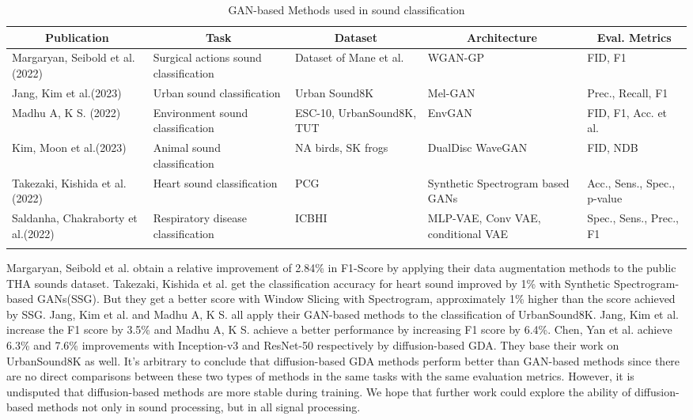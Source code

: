 \documentclass[preprint,12pt,authoryear]{elsarticle}
\begin{document}
{\small
\begin{longtable}{|p{2cm}|p{3cm}|p{2cm}|p{2cm}|p{2cm}|}
\hline
\multicolumn{1}{|c|}{\textbf{Publication}} &
  \multicolumn{1}{c|}{\textbf{Task}} &
  \multicolumn{1}{c|}{\textbf{Dataset}} &
  \multicolumn{1}{c|}{\textbf{Architecture}} &
  \multicolumn{1}{c|}{\textbf{Eval. Metrics}} \\ \hline
\endfirsthead
%
\endhead
%
Margaryan, Seibold et al.(2022)\cite{apl74} &
  Surgical actions sound classification &
  Dataset of Mane et al. &
  WGAN-GP &
  FID, F1 \\ \hline
Jang, Kim et al.(2023)\cite{apl75} &
  Urban sound classification &
  Urban Sound8K &
  Mel-GAN &
  Prec., Recall, F1 \\ \hline
Madhu A, K S. (2022)\cite{apl79} &
  Environment  sound classification &
  ESC-10, UrbanSound8K, TUT &
  EnvGAN &
  FID, F1, Acc. et al. \\ \hline
Kim, Moon et al.(2023)\cite{apl76} &
  Animal sound classification &
  NA birds, SK frogs &
  DualDisc WaveGAN &
  FID, NDB \\ \hline
Takezaki, Kishida et al.(2022)\cite{apl78} &
  Heart sound classification &
  PCG &
  Synthetic Spectrogram based GANs &
  Acc., Sens., Spec., p-value \\ \hline
Saldanha, Chakraborty et al.(2022)\cite{apl77} &
  Respiratory disease classification &
  ICBHI &
  MLP-VAE, Conv VAE, conditional VAE &
  Spec., Sens., Prec., F1 \\ \hline
\caption{GAN-based Methods used in sound classification}
\label{tab:my-table}\\
\end{longtable}}

Margaryan, Seibold et al.\cite{apl74} obtain a relative improvement of 2.84\% in F1-Score by applying their data augmentation methods to the public THA sounds dataset. Takezaki, Kishida et al.\cite{apl78} get the classification accuracy for heart sound improved by 1\% with Synthetic Spectrogram-based GANs(SSG). But they get a better score with Window Slicing with Spectrogram, approximately 1\% higher than the score achieved by SSG. Jang, Kim et al.\cite{apl75} and Madhu A, K S.\cite{apl79} all apply their GAN-based methods to the classification of UrbanSound8K. Jang, Kim et al. increase the F1 score by 3.5\% and Madhu A, K S. achieve a better performance by increasing F1 score by 6.4\%. Chen, Yan et al. achieve 6.3\% and 7.6\% improvements with Inception-v3 and ResNet-50 respectively by diffusion-based GDA. They base their work on UrbanSound8K as well. It's arbitrary to conclude that diffusion-based GDA methods perform better than GAN-based methods since there are no direct comparisons between these two types of methods in the same tasks with the same evaluation metrics. However, it is undisputed that diffusion-based methods are more stable during training. We hope that further work could explore the ability of diffusion-based methods not only in sound processing, but in all signal processing.
\end{document}
